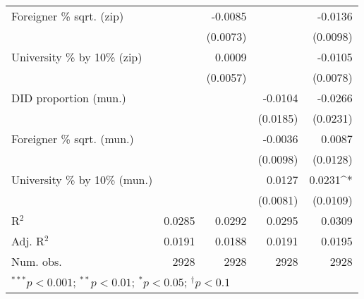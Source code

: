 \begin{tabular}{l D{.}{.}{4.6} D{.}{.}{4.6} D{.}{.}{4.6} D{.}{.}{4.6}}
Foreigner \% sqrt. (zip)          &             & -0.0085     &             & -0.0136     \\
                                  &             & (0.0073)    &             & (0.0098)    \\
University \% by 10\% (zip)       &             & 0.0009      &             & -0.0105     \\
                                  &             & (0.0057)    &             & (0.0078)    \\
DID proportion (mun.)             &             &             & -0.0104     & -0.0266     \\
                                  &             &             & (0.0185)    & (0.0231)    \\
Foreigner \% sqrt. (mun.)         &             &             & -0.0036     & 0.0087      \\
                                  &             &             & (0.0098)    & (0.0128)    \\
University \% by 10\% (mun.)      &             &             & 0.0127      & 0.0231^{*}  \\
                                  &             &             & (0.0081)    & (0.0109)    \\
\midrule
R$^2$                             & 0.0285      & 0.0292      & 0.0295      & 0.0309      \\
Adj. R$^2$                        & 0.0191      & 0.0188      & 0.0191      & 0.0195      \\
Num. obs.                         & 2928        & 2928        & 2928        & 2928        \\
\bottomrule
{}
\end{tabular}
